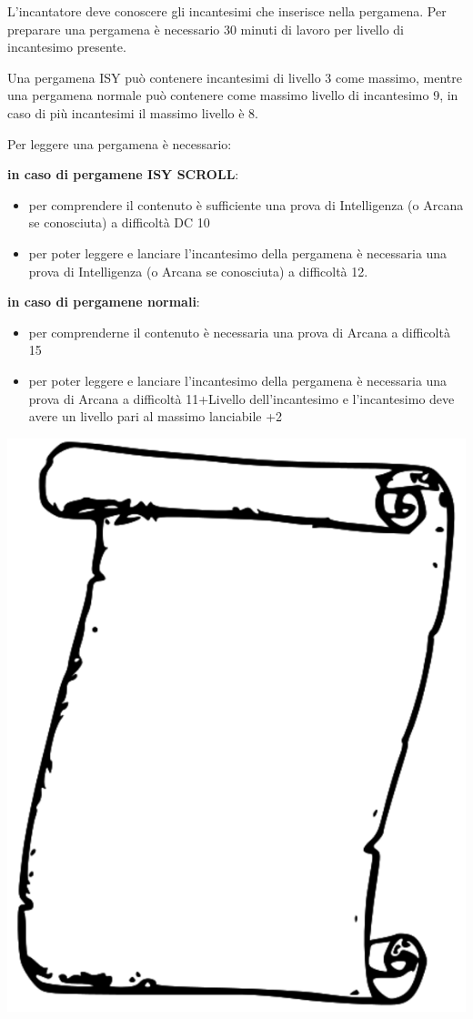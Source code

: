 \begin{multicols}{2}
L'incantatore deve conoscere gli incantesimi che inserisce nella pergamena. Per preparare una pergamena è necessario 30 minuti di lavoro per livello di incantesimo presente.

Una pergamena ISY può contenere incantesimi di livello 3 come massimo, mentre una pergamena normale può contenere come massimo livello di incantesimo 9, in caso di più incantesimi il massimo livello è 8.

\medskip

Per leggere una pergamena è necessario:\label{leggerepergamena}

\medskip

\textbf{in caso di pergamene ISY SCROLL}:

\begin{itemize}[leftmargin=*] \setlength{\itemsep}{0pt}
\item per comprendere il contenuto è sufficiente una prova di Intelligenza (o Arcana se conosciuta) a difficoltà DC 10
\item per poter leggere e lanciare l'incantesimo della pergamena è necessaria una prova di Intelligenza (o Arcana se conosciuta) a difficoltà 12.
\end{itemize}

\textbf{in caso di pergamene normali}:

\begin{itemize}[leftmargin=*] \setlength{\itemsep}{0pt}
\item per comprenderne il contenuto è necessaria una prova di Arcana a difficoltà 15
\item per poter leggere e lanciare l'incantesimo della pergamena è necessaria una prova di Arcana a difficoltà 11+Livello dell'incantesimo e l'incantesimo deve avere un livello pari al massimo lanciabile +2
\end{itemize}

\begin{center}
\includegraphics[width=0.4\linewidth]{immagini/scroll3.png}
\end{center}


\end{multicols}
